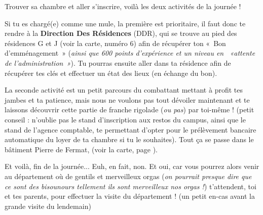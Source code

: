 Trouver sa chambre et aller s'inscrire, voilà les deux activités de la journée !

\vspace{1em}

Si tu es chargé(e) comme une mule, la première est prioritaire, il faut donc te
rendre à la \textbf{Direction Des Résidences} (DDR), qui se trouve au pied des résidences
G et J (voir la carte, numéro 6) afin de récupérer ton «~Bon d'emménagement~» (\emph{ainsi que 600 points
d'expérience et un niveau en ~«attente de l'administration~»}).
Tu pourras ensuite aller dans ta résidence afin de récupérer tes
clés et effectuer un état des lieux (en échange du bon).

\vspace{1em}

La seconde activité est un petit parcours du combattant mettant à profit tes 
jambes et ta patience, mais nous ne voulons pas tout dévoiler maintenant et
te laissons découvrir cette partie de franche rigolade (\emph{ou pas}) par toi-même !
(petit conseil : n'oublie pas le stand d'inscription aux restos du campus, ainsi que le
 stand de l'agence comptable, te permettant d'opter pour le prélèvement bancaire
 automatique du loyer de ta chambre si tu le souhaites). Tout ça se passe dans le 
 bâtiment Pierre de Fermat, (voir la carte, page \pageref{plan}).

 \vspace{1em}
 
Et voilà, fin de la journée... Euh, en fait, non.
Et oui, car vous pourrez alors venir au département où de gentils et merveilleux
orgas (\emph{on pourrait presque dire que ce sont des bisounours tellement ils sont
merveilleux nos orgas !}) t'attendent, toi et tes parents, pour effectuer
la visite du département ! (un petit en-cas avant la grande visite du lendemain) 
